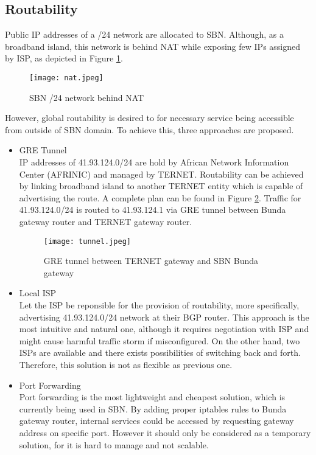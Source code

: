 \subsection{Routability}
Public IP addresses of a /24 network are allocated to SBN. Although, as a broadband island, this network is behind NAT while exposing few IPs assigned by ISP, as depicted in Figure \ref{nat}.
\begin{figure}[htbp]
\centering
\texttt{[image: nat.jpeg]}
\caption{SBN /24 network behind NAT}
\label{nat}
\end{figure}
However, global routability is desired to for necessary service being accessible from outside of SBN domain. To achieve this, three approaches are proposed.
\begin{itemize}
\item GRE Tunnel\\
IP addresses of 41.93.124.0/24 are hold by African Network Information Center (AFRINIC) and managed by TERNET. Routability can be achieved by linking broadband island to another TERNET entity which is capable of advertising the route. A complete plan can be found in Figure \ref{tunnel}. Traffic for 41.93.124.0/24 is routed to 41.93.124.1 via GRE tunnel between Bunda gateway router and TERNET gateway router.
\begin{figure}[htbp]
\centering
\texttt{[image: tunnel.jpeg]}
\caption{GRE tunnel between TERNET gateway and SBN Bunda gateway}
\label{tunnel}
\end{figure}
\item Local ISP\\
Let the ISP be reponsible for the provision of routability, more specifically, advertising 41.93.124.0/24 network at their BGP router. This approach is the most intuitive and natural one, although it requires negotiation with ISP and might cause harmful traffic storm if misconfigured. On the other hand, two ISPs are available and there exists possibilities of switching back and forth. Therefore, this solution is not as flexible as previous one.
\item Port Forwarding\\
Port forwarding is the most lightweight and cheapest solution, which is currently being used in SBN. By adding proper iptables rules to Bunda gateway router, internal services could be accessed by requesting gateway address on specific port. However it should only be considered as a temporary solution, for it is hard to manage and not scalable.
\end{itemize}

